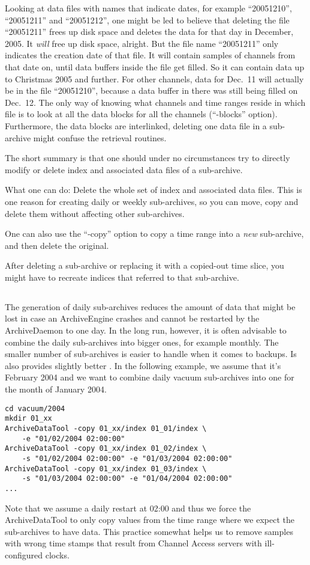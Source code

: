 Looking at data files with names that indicate dates, for example
``20051210'', ``20051211'' and ``20051212'', one might be led to
believe that deleting the file ``20051211'' frees up disk space and
deletes the data for that day in December, 2005.  It \emph{will} free
up disk space, alright. But the file name ``20051211'' only indicates
the creation date of that file.  It will contain samples of channels
from that date on, until data buffers inside the file get filled.  So
it can contain data up to Christmas 2005 and further.  For other
channels, data for Dec.\ 11 will actually be in the file ``20051210'',
because a data buffer in there was still being filled on Dec.\ 12.
The only way of knowing what channels and time ranges reside in which
file is to look at all the data blocks for all the channels
(``-blocks'' option).  Furthermore, the data blocks are interlinked,
deleting one data file in a sub-archive might confuse the retrieval
routines.

\NOTE The short summary is that one should under no circumstances try
to directly modify or delete index and associated data files of a sub-archive.

What one can do: Delete the whole set of index and associated data
files. This is one reason for creating daily or weekly sub-archives,
so you can move, copy and delete them without affecting other
sub-archives.

One can also use the ``-copy'' option to copy a time range into a
\emph{new} sub-archive, and then delete the original.

After deleting a sub-archive or replacing it with a copied-out time
slice, you might have to recreate indices that referred to that sub-archive.

\subsection{}
The generation of daily sub-archives reduces the amount of data that
might be lost in case an ArchiveEngine crashes and cannot be restarted
by the ArchiveDaemon to one day. In the long run, however, it is often
advisable to combine the daily sub-archives into bigger ones, for
example monthly. The smaller number of sub-archives is easier to
handle when it comes to backups. Is also provides slightly better
. 
In the following example, we assume that it's February 2004 and we want
to combine daily vacuum sub-archives into one for the month of January
2004.
\begin{lstlisting}[frame=none,keywordstyle=\sffamily]
cd vacuum/2004
mkdir 01_xx
ArchiveDataTool -copy 01_xx/index 01_01/index \
    -e "01/02/2004 02:00:00"
ArchiveDataTool -copy 01_xx/index 01_02/index \
    -s "01/02/2004 02:00:00" -e "01/03/2004 02:00:00"
ArchiveDataTool -copy 01_xx/index 01_03/index \
    -s "01/03/2004 02:00:00" -e "01/04/2004 02:00:00"
...
\end{lstlisting}
\noindent Note that we assume a daily restart at 02:00 and thus we
force the ArchiveDataTool to only copy values from the time range
where we expect the sub-archives to have data. This practice somewhat
helps us to remove samples with wrong time stamps that result from
Channel Access servers with ill-configured clocks.

